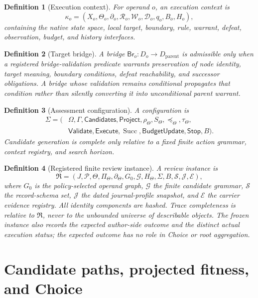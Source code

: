 \documentclass[10pt]{article}
\newtheorem{definition}{Definition}[section]
\newcommand{\Succ}{\operatorname{Succ}}
\newcommand{\Config}{\Sigma}
\newcommand{\Operands}{\Omega}
\newcommand{\Contexts}{\Gamma}
\newcommand{\Candidates}{\mathsf{Candidates}}
\newcommand{\Project}{\mathsf{Project}}
\newcommand{\Validate}{\mathsf{Validate}}
\newcommand{\Execute}{\mathsf{Execute}}
\newcommand{\BudgetUpdate}{\mathsf{BudgetUpdate}}
\newcommand{\Target}{\Theta}
\newcommand{\Bridge}{\mathsf{Br}}
\begin{document}
\begin{definition}[Execution context]
For operand $o$, an execution context is
\[
  \kappa_o=(X_o,\Target_o,\partial_o,\mathcal R_o,
  \mathcal W_o,\mathcal D_o,q_o,B_o,H_o),
\]
containing the native state space, local target, boundary, rule, warrant, defeat, observation, budget, and history interfaces.
\end{definition}

\begin{definition}[Target bridge]
A bridge $\Bridge_o:D_o\to D_{\mathrm{parent}}$ is admissible only when a registered bridge-validation predicate warrants preservation of node identity, target meaning, boundary conditions, defeat reachability, and successor obligations.  A bridge whose validation remains conditional propagates that condition rather than silently converting it into unconditional parent warrant.
\end{definition}

\begin{definition}[Assessment configuration]
A configuration is
\[
\begin{aligned}
\Config=(
&\Operands,\Contexts,\Candidates,\Project,\rho_\Target,S_\Target,
\preceq_\Target,\tau_\Target,\\
&\Validate,\Execute,\Succ,\BudgetUpdate,\mathsf{Stop},B).
\end{aligned}
\]
Candidate generation is complete only relative to a fixed finite action grammar, context registry, and search horizon.
\end{definition}

\begin{definition}[Registered finite review instance]
A review instance is
\[
  \mathfrak R=(J,\mathcal P,\Target,\Pi_\Target,
  \partial_\Target,G_0,\mathcal G,H_\Target,
  \Config,B,\mathcal S,\mathcal J,\mathcal E),
\]
where $G_0$ is the policy-selected operand graph, $\mathcal G$ the finite candidate grammar, $\mathcal S$ the record-schema set, $\mathcal J$ the dated journal-profile snapshot, and $\mathcal E$ the carrier evidence registry.  All identity components are hashed.  Trace completeness is relative to $\mathfrak R$, never to the unbounded universe of describable objects.  The frozen instance also records the expected author-side outcome and the distinct actual execution status; the expected outcome has no role in Choice or root aggregation.
\end{definition}

\section{Candidate paths, projected fitness, and Choice}
\end{document}
